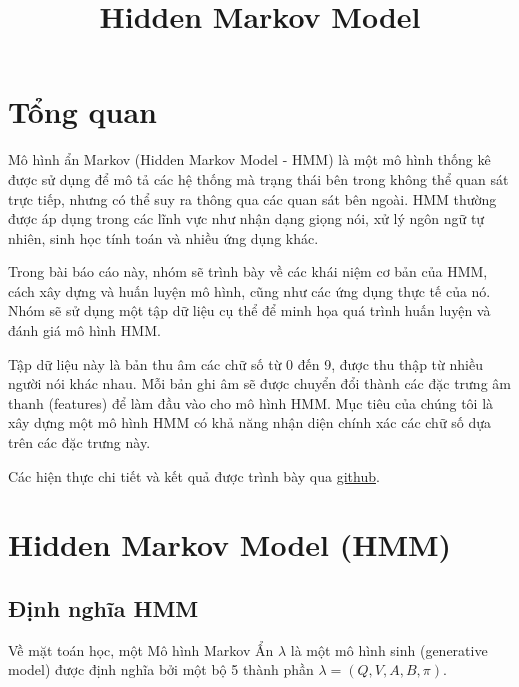 \documentclass[twoside, final]{hcmut_report}
\title{\LARGE Hidden Markov Model}
\begin{document}
\coverpage
\pagestyle{empty}
\tableofcontents
\pagestyle{fancy}
\pagebreak
\section{Tổng quan}
Mô hình ẩn Markov (Hidden Markov Model - HMM) là một mô hình thống kê được sử dụng để mô tả các hệ thống mà trạng thái bên trong không thể quan sát trực tiếp, nhưng có thể suy ra thông qua các quan sát bên ngoài. HMM thường được áp dụng trong các lĩnh vực như nhận dạng giọng nói, xử lý ngôn ngữ tự nhiên, sinh học tính toán và nhiều ứng dụng khác.

Trong bài báo cáo này, nhóm sẽ trình bày về các khái niệm cơ bản của HMM, cách xây dựng và huấn luyện mô hình, cũng như các ứng dụng thực tế của nó. Nhóm sẽ sử dụng một tập dữ liệu cụ thể để minh họa quá trình huấn luyện và đánh giá mô hình HMM.

Tập dữ liệu này là bản thu âm các chữ số từ 0 đến 9, được thu thập từ nhiều người nói khác nhau. Mỗi bản ghi âm sẽ được chuyển đổi thành các đặc trưng âm thanh (features) để làm đầu vào cho mô hình HMM. Mục tiêu của chúng tôi là xây dựng một mô hình HMM có khả năng nhận diện chính xác các chữ số dựa trên các đặc trưng này.

Các hiện thực chi tiết và kết quả được trình bày qua \href{https://github.com/ChiThanh512/Machine-Learning-Project-251---CEML1.git}{github}.
\section{Hidden Markov Model (HMM)}
\subsection{Định nghĩa HMM}

Về mặt toán học, một Mô hình Markov Ẩn $\lambda$ là một mô hình sinh (generative model) được định nghĩa bởi một bộ 5 thành phần $\lambda = (Q, V, A, B, \pi)$.
\end{document}
